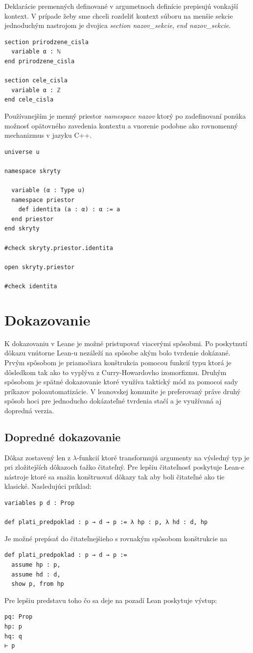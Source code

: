 \documentclass[a4paper,10pt,oneside]{report}%
\begin{document}
    Deklarácie premenných definované v argumetnoch definície prepisujú vonkajší kontext.
    V prípade žeby sme chceli rozdeliť kontext súboru na menšie sekcie jednoduchým
nastrojom je dvojica \emph{section nazov\_sekcie}, \emph{end nazov\_sekcie}.
\begin{lstlisting}
section prirodzene_cisla
  variable α : ℕ
end prirodzene_cisla

section cele_cisla
  variable α : ℤ
end cele_cisla
\end{lstlisting}
    Používanejším je menný priestor \emph{namespace nazov} ktorý po zadefinovaní ponúka
možnosť opätovného zavedenia kontextu a vnorenie podobne ako rovnomenný mechanizmus
v jazyku C++.
\begin{lstlisting}
universe u

namespace skryty

  variable (α : Type u)
  namespace priestor
    def identita (a : α) : α := a
  end priestor
end skryty

#check skryty.priestor.identita

open skryty.priestor

#check identita
\end{lstlisting}
\section{Dokazovanie}

    K dokazovaniu v Leane je možné pristupovať viacerými spôsobmi.
    Po poskytnutí dôkazu vnútorne Lean-u nezáleží na spôsobe akým bolo tvrdenie 
dokázané.
    Prvým spôsobom je priamočiara konštrukcia pomocou funkcií typu ktorá je dôsledkom
tak ako to vyplýva z Curry-Howardovho izomorfizmu.
    Druhým spôsobom je spätné dokazovanie ktoré využíva taktický mód za pomocoi
sady príkazov poloautomatizácie.
    V leanovskej komunite je preferovaný práve druhý spôsob hoci pre jednoducho
dokázateľné tvrdenia stačí a je využívaná aj dopredná verzia.

\subsection{Dopredné dokazovanie}
    Dôkaz zostavený len z $\lambda$-funkcií ktoré transformujú argumenty
na výsledný typ je pri zložitejších dôkazoch ťažko čitateľný.
    Pre lepšiu čitateľnosť poskytuje Lean-e nástroje ktoré sa snažia konštruovať dôkazy tak
aby boli čitateľné ako tie klasické.
    Nasledujúci príklad:
\begin{lstlisting}
variables p d : Prop

def plati_predpoklad : p → d → p := λ hp : p, λ hd : d, hp
\end{lstlisting}
    Je možné prepísať do čitateľnejšieho s rovnakým spôsobom konštrukcie na
\begin{lstlisting}
def plati_predpoklad : p → d → p :=
  assume hp : p,
  assume hd : d,
  show p, from hp
\end{lstlisting}
Pre lepšiu predstavu toho čo sa deje na pozadí Lean poskytuje výstup:
\begin{lstlisting}
pq: Prop
hp: p
hq: q
⊢ p
\end{lstlisting}
\end{document}
